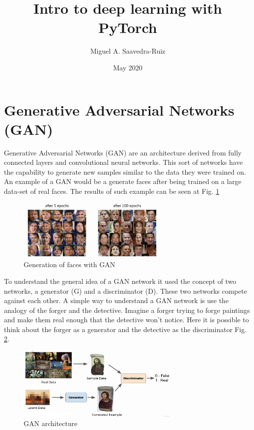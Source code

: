 \documentclass{article}
\title{Intro to deep learning with PyTorch}
\author{Miguel A. Saavedra-Ruiz}
\date{May 2020}
\begin{document}
\maketitle

\section*{Generative Adversarial Networks (GAN)}

Generative Adversarial Networks (GAN) are an architecture derived from fully connected layers and convolutional neural networks. This sort of networks have the capability to generate new samples similar to the data they were trained on. An example of a GAN would be a generate faces after being trained on a large data-set of real faces. The results of such example can be seen at Fig. \ref{fig:f1}


\begin{figure}[ht]
    \centering
    \includegraphics[width=0.65\textwidth,height=0.65\textheight,keepaspectratio]{images/face_generator.png}
    \captionsetup{justification=centering}
    \caption{Generation of faces with GAN}
    \label{fig:f1}
\end{figure}

To understand the general idea of a GAN network it used the concept of two networks, a generator (G) and a discriminator (D). These two networks compete against each other. A simple way to understand a GAN network is use the analogy of the forger and the detective. Imagine a forger trying to forge paintings and make them real enough that the detective won't notice. Here it is possible to think about the forger as a generator and the detective as the discriminator Fig. \ref{fig:f2}.

\begin{figure}[ht]
    \centering
    \includegraphics[width=0.7\textwidth,height=0.7\textheight,keepaspectratio]{images/gan.png}
    \captionsetup{justification=centering}
    \caption{GAN architecture}
    \label{fig:f2}
\end{figure}
\end{document}
